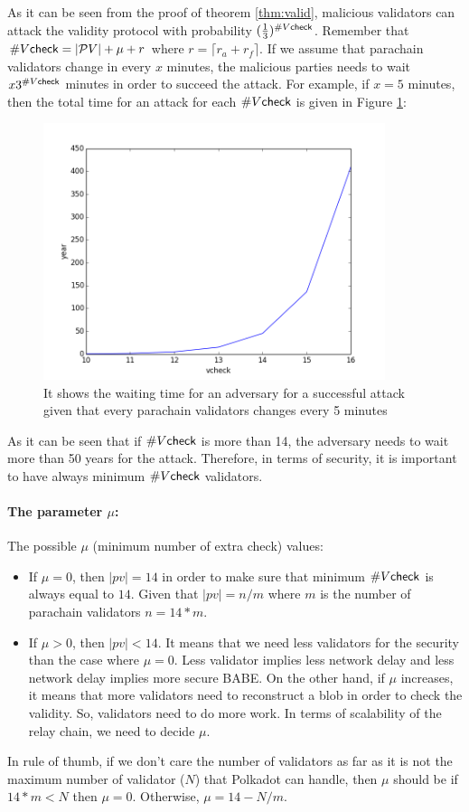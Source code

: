 As it can be seen from the proof of theorem \ref{thm:valid}, malicious validators can attack the validity protocol with probability $(\frac{1}{3})^{\#V\mathsf{check}}$. Remember that $\#V\mathsf{check} = |\mathcal{P}V| + \mu + r$ where $r = \lceil r_a + r_f \rceil$. If we assume that parachain validators change in every $x$ minutes, the malicious parties needs to wait $x3^{\#V\mathsf{check}}$ minutes in order to succeed the attack. For example, if $x = 5$ minutes, then the total time for an attack for each $\#V\mathsf{check}$ is given in Figure \ref{fig:totaltime}:


\begin{figure}[h]\centering
	  \includegraphics[width=10cm]{images/year.png}
	  \caption{It shows the waiting time for an adversary for a successful attack given that every parachain validators changes every 5 minutes}
	  \label{fig:totaltime}
\end{figure}

As it can be seen that if $\#V\mathsf{check}$ is more than 14, the adversary needs to wait more than 50 years for the attack. Therefore, in terms of security, it is important to have always minimum $\#V\mathsf{check}$ validators.

\paragraph{The parameter $\mu$:} The possible $\mu$ (minimum number of extra check) values:

\begin{itemize}
    \item If $\mu = 0$, then $|pv| = 14$ in order to make sure that minimum $\#V\mathsf{check}$ is always equal to $14$. Given that $|pv| = n/m$ where $m$ is the number of parachain validators $n = 14 * m$. 
    
    \item If $\mu > 0$, then $|pv| < 14$. It means that we need less validators for the security than the case where $\mu = 0$. Less validator implies less network delay and less network delay implies more secure BABE. On the other hand, if $\mu$ increases, it means that more validators need to reconstruct a blob in order to check the validity. So, validators need to do more work. In terms of scalability of the relay chain, we need to decide $\mu$. 
\end{itemize}
In rule of thumb, if we don't care the number of validators as far as it is not the maximum  number of validator ($N$) that Polkadot can handle, then $\mu$ should be if $14 * m < N$ then $\mu = 0$. Otherwise, $\mu = 14 -N/m$. 

